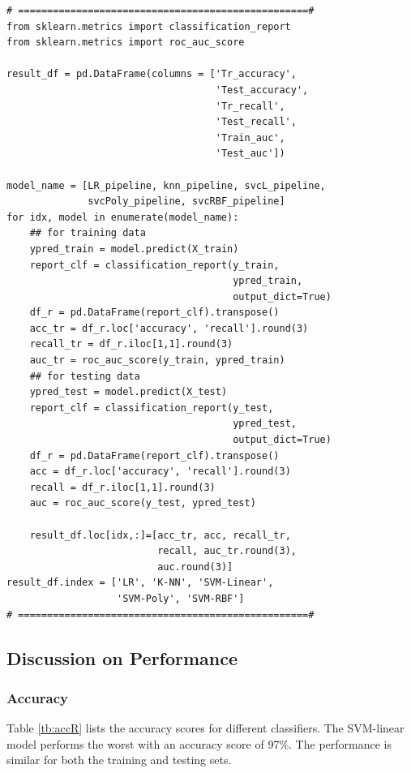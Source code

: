 \begin{lstlisting}
# ==================================================#
from sklearn.metrics import classification_report
from sklearn.metrics import roc_auc_score

result_df = pd.DataFrame(columns = ['Tr_accuracy',
                                    'Test_accuracy',
                                    'Tr_recall',
                                    'Test_recall',
                                    'Train_auc',
                                    'Test_auc'])

model_name = [LR_pipeline, knn_pipeline, svcL_pipeline,
              svcPoly_pipeline, svcRBF_pipeline]
for idx, model in enumerate(model_name):
    ## for training data
    ypred_train = model.predict(X_train)
    report_clf = classification_report(y_train,
                                       ypred_train,
                                       output_dict=True)
    df_r = pd.DataFrame(report_clf).transpose()
    acc_tr = df_r.loc['accuracy', 'recall'].round(3)
    recall_tr = df_r.iloc[1,1].round(3)
    auc_tr = roc_auc_score(y_train, ypred_train)
    ## for testing data
    ypred_test = model.predict(X_test)
    report_clf = classification_report(y_test,
                                       ypred_test,
                                       output_dict=True)
    df_r = pd.DataFrame(report_clf).transpose()
    acc = df_r.loc['accuracy', 'recall'].round(3)
    recall = df_r.iloc[1,1].round(3)
    auc = roc_auc_score(y_test, ypred_test)

    result_df.loc[idx,:]=[acc_tr, acc, recall_tr,
                          recall, auc_tr.round(3),
                          auc.round(3)]
result_df.index = ['LR', 'K-NN', 'SVM-Linear',
                   'SVM-Poly', 'SVM-RBF']
# ==================================================#
\end{lstlisting}

\subsection{Discussion on Performance}

\subsubsection{\textbf{Accuracy}}

Table \ref{tb:accR} lists the accuracy scores for different classifiers. The SVM-linear model performs the worst with an accuracy score of 97\%. The performance is similar for both the training and testing sets.

